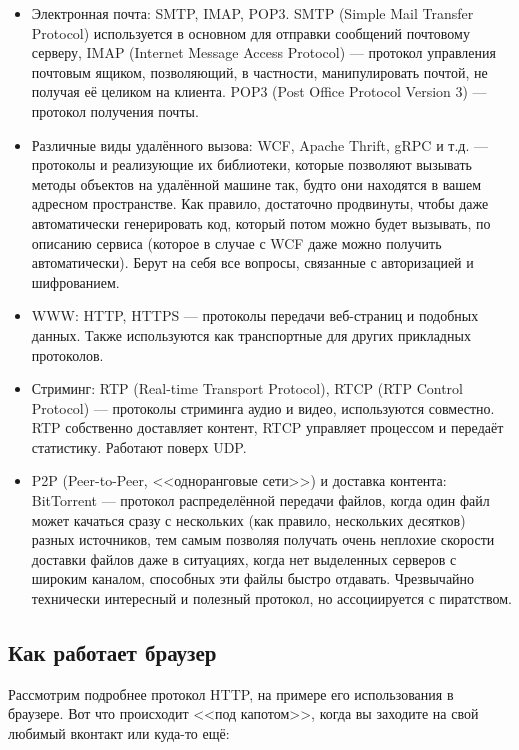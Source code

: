 \documentclass[a5paper]{article}
\begin{document}
\begin{itemize}
    \item Электронная почта: SMTP, IMAP, POP3. SMTP (Simple Mail Transfer Protocol) используется в основном для отправки сообщений почтовому серверу, IMAP (Internet Message Access Protocol) --- протокол управления почтовым ящиком, позволяющий, в частности, манипулировать почтой, не получая её целиком на клиента. POP3 (Post Office Protocol Version 3) --- протокол получения почты.
    \item Различные виды удалённого вызова: WCF, Apache Thrift, gRPC и т.д. --- протоколы и реализующие их библиотеки, которые позволяют вызывать методы объектов на удалённой машине так, будто они находятся в вашем адресном пространстве. Как правило, достаточно продвинуты, чтобы даже автоматически генерировать код, который потом можно будет вызывать, по описанию сервиса (которое в случае с WCF даже можно получить автоматически). Берут на себя все вопросы, связанные с авторизацией и шифрованием.
    \item WWW: HTTP, HTTPS --- протоколы передачи веб-страниц и подобных данных. Также используются как транспортные для других прикладных протоколов.
    \item Стриминг: RTP (Real-time Transport Protocol), RTCP (RTP Control Protocol) --- протоколы стриминга аудио и видео, используются совместно. RTP собственно доставляет контент, RTCP управляет процессом и передаёт статистику. Работают поверх UDP.
    \item P2P (Peer-to-Peer, <<одноранговые сети>>) и доставка контента: BitTorrent --- протокол распределённой передачи файлов, когда один файл может качаться сразу с нескольких (как правило, нескольких десятков) разных источников, тем самым позволяя получать очень неплохие скорости доставки файлов даже в ситуациях, когда нет выделенных серверов с широким каналом, способных эти файлы быстро отдавать. Чрезвычайно технически интересный и полезный протокол, но ассоциируется с пиратством.
\end{itemize}

\subsection{Как работает браузер}

Рассмотрим подробнее протокол HTTP, на примере его использования в браузере. Вот что происходит <<под капотом>>, когда вы заходите на свой любимый вконтакт или куда-то ещё:
\end{document}
